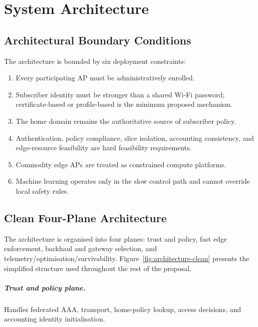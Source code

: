 \chapter{System Architecture}
\label{ch:arch}

\section{Architectural Boundary Conditions}
\label{sec:boundary}

The architecture is bounded by six deployment constraints:
\begin{enumerate}
  \item Every participating AP must be administratively enrolled.
  \item Subscriber identity must be stronger than a shared Wi-Fi password; certificate-based or profile-based \eap{} is the minimum proposed mechanism.
  \item The home domain remains the authoritative source of subscriber policy.
  \item Authentication, policy compliance, slice isolation, accounting consistency, and edge-resource feasibility are hard feasibility requirements.
  \item Commodity edge APs are treated as constrained compute platforms.
  \item Machine learning operates only in the slow control path and cannot override local safety rules.
\end{enumerate}

\section{Clean Four-Plane Architecture}
\label{sec:clean-architecture}

The architecture is organised into four planes: trust and policy, fast edge enforcement, backhaul and gateway selection, and telemetry/optimisation/survivability. Figure~\ref{fig:architecture-clean} presents the simplified structure used throughout the rest of the proposal.



\paragraph{Trust and policy plane.} Handles federated AAA, \radsec{} transport, home-policy lookup, access decisions, and accounting identity initialisation.

